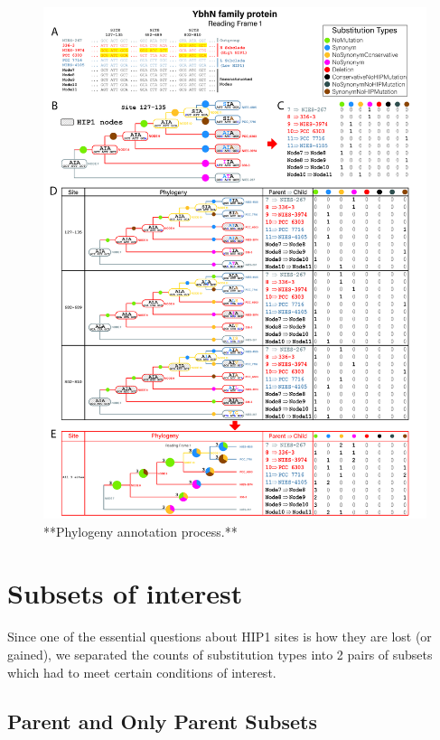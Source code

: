 \documentclass[
]{book}
\begin{document}
\begin{figure}
\includegraphics[width=1\linewidth]{figures/4x/philogenies_annotation} \caption{**Phylogeny annotation process.**}\label{fig:FIG5x}
\end{figure}

\hypertarget{subsets-of-interest}{%
\section{Subsets of interest}\label{subsets-of-interest}}

Since one of the essential questions about HIP1 sites is how they are lost (or gained), we separated the counts of substitution types into 2 pairs of subsets which had to meet certain conditions of interest.

\hypertarget{parent-and-only-parent-subsets}{%
\subsection{Parent and Only Parent Subsets}\label{parent-and-only-parent-subsets}}
\end{document}

